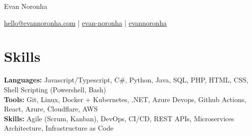 \documentclass[11pt]{article}       %
\begin{document}
\centerline{\Huge Evan Noronha}

\vspace{5pt}

\centerline {\href{mailto:hello@evannoronha.com}{\faEnvelope \space hello@evannoronha.com} | \href{https://www.linkedin.com/in/evan-noronha/}{\faLinkedin \space evan-noronha} | \href{https://github.com/evannoronha}{\faGithub \space evannoronha}}

\vspace{-10pt}

\section*{Skills}
\textbf{Languages:} Javascript/Typescript, C\#, Python, Java, SQL, PHP, HTML, CSS, Shell Scripting (Powershell, Bash) \\
\textbf{Tools:} Git, Linux, Docker + Kubernetes, .NET, Azure Devops, Github Actions, React, Azure, Cloudflare, AWS \\
\textbf{Skills:} Agile (Scrum, Kanban), DevOps, CI/CD, REST APIs, Microservices Architecture, Infrastructure as Code \\

\vspace{-6.5pt}

\end{document}

